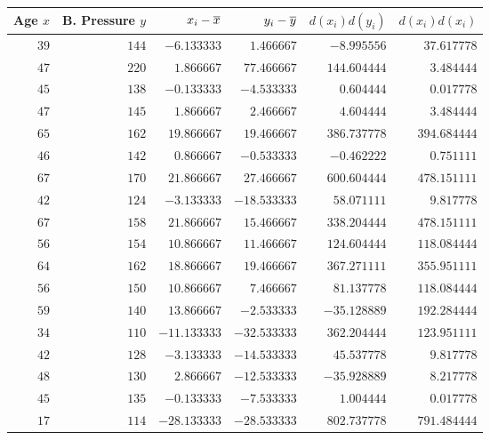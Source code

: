 \begin{tabular}{rrrrrr}                                                                      \toprule
Age $x$ & B. Pressure $y$ & $x_i - \overline{x}$ & $y_i - \overline{y}$ & $d(x_i)d(y_i)$ & $d(x_i)d(x_i)$ \\\midrule
$39$    & $144$           & $-6.133333$   & $1.466667$    & $-8.995556$   & $37.617778$    \\
$47$    & $220$           & $1.866667$    & $77.466667$   & $144.604444$  & $3.484444$     \\
$45$    & $138$           & $-0.133333$   & $-4.533333$   & $0.604444$    & $0.017778$     \\
$47$    & $145$           & $1.866667$    & $2.466667$    & $4.604444$    & $3.484444$     \\
$65$    & $162$           & $19.866667$   & $19.466667$   & $386.737778$  & $394.684444$   \\
$46$    & $142$           & $0.866667$    & $-0.533333$   & $-0.462222$   & $0.751111$     \\
$67$    & $170$           & $21.866667$   & $27.466667$   & $600.604444$  & $478.151111$   \\
$42$    & $124$           & $-3.133333$   & $-18.533333$  & $58.071111$   & $9.817778$     \\
$67$    & $158$           & $21.866667$   & $15.466667$   & $338.204444$  & $478.151111$   \\
$56$    & $154$           & $10.866667$   & $11.466667$   & $124.604444$  & $118.084444$   \\
$64$    & $162$           & $18.866667$   & $19.466667$   & $367.271111$  & $355.951111$   \\
$56$    & $150$           & $10.866667$   & $7.466667$    & $81.137778$   & $118.084444$   \\
$59$    & $140$           & $13.866667$   & $-2.533333$   & $-35.128889$  & $192.284444$   \\
$34$    & $110$           & $-11.133333$  & $-32.533333$  & $362.204444$  & $123.951111$   \\
$42$    & $128$           & $-3.133333$   & $-14.533333$  & $45.537778$   & $9.817778$     \\
$48$    & $130$           & $2.866667$    & $-12.533333$  & $-35.928889$  & $8.217778$     \\
$45$    & $135$           & $-0.133333$   & $-7.533333$   & $1.004444$    & $0.017778$     \\
$17$    & $114$           & $-28.133333$  & $-28.533333$  & $802.737778$  & $791.484444$   \\

\end{tabular}
